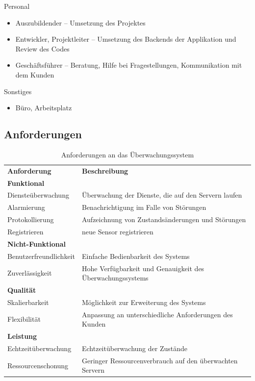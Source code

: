 Personal
\begin{itemize}
\item Auszubildender -- Umsetzung des Projektes
\item Entwickler, Projektleiter – Umsetzung des Backends der Applikation und Review des Codes
\item Geschäftsführer – Beratung, Hilfe bei Fragestellungen, Kommunikation mit dem Kunden
\end{itemize}
Sonstiges
\begin{itemize}
\item Büro, Arbeitsplatz
\end{itemize}
\clearpage



\subsection{Anforderungen}\label{appendix:a4}\par
\begin{table}[h]
	\centering
	\begin{tabular}{ l l }
	\hline
	\rowcolor[HTML]{127017}
	\textbf{\color{white}Anforderung} & \textbf{\color{white}Beschreibung} \\
	\rowcolor[HTML]{e1efd9}
	\textbf{Funktional} & \\
	Diensteüberwachung & Überwachung der Dienste, die auf den Servern laufen \\
	Alarmierung & Benachrichtigung im Falle von Störungen \\
	Protokollierung & Aufzeichnung von Zustandsänderungen und Störungen \\
	Registrieren & neue Sensor registrieren \\
	\rowcolor[HTML]{e1efd9}
	\textbf{Nicht-Funktional} & \\
	Benutzerfreundlichkeit & Einfache Bedienbarkeit des Systems \\
	Zuverlässigkeit & Hohe Verfügbarkeit und Genauigkeit des Überwachungssystems \\
	\rowcolor[HTML]{e1efd9}
	\textbf{Qualität} & \\
	Skalierbarkeit & Möglichkeit zur Erweiterung des Systems \\
	Flexibilität & Anpassung an unterschiedliche Anforderungen des Kunden \\
	\rowcolor[HTML]{e1efd9}
	\textbf{Leistung} & \\
	Echtzeitüberwachung & Echtzeitüberwachung der Zustände \\
	Ressourcenschonung & Geringer Ressourcenverbrauch auf den überwachten Servern \\
	\end{tabular}
	\caption{Anforderungen an das Überwachungssystem}
\end{table}
\clearpage

